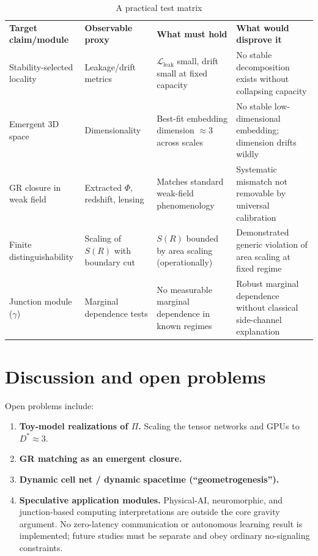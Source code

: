 \documentclass[reprint, amsmath, amssymb, aps, prd]{revtex4-2}
\begin{document}
\begin{table}[htbp]
\caption{A practical test matrix}
\begin{ruledtabular}
\begin{tabular}{llp{4.5cm}p{4.5cm}}
\textbf{Target claim/module} & \textbf{Observable proxy} & \textbf{What must hold} & \textbf{What would disprove it} \\
\colrule
Stability-selected locality & Leakage/drift metrics & $\mathcal{L}_{\text{leak}}$ small, drift small at fixed capacity & No stable decomposition exists without collapsing capacity \\
Emergent 3D space & Dimensionality & Best-fit embedding dimension $\approx 3$ across scales & No stable low-dimensional embedding; dimension drifts wildly \\
GR closure in weak field & Extracted $\Phi$, redshift, lensing & Matches standard weak-field phenomenology & Systematic mismatch not removable by universal calibration \\
Finite distinguishability & Scaling of $S(R)$ with boundary cut & $S(R)$ bounded by area scaling (operationally) & Demonstrated generic violation of area scaling at fixed regime \\
Junction module ($\gamma$) & Marginal dependence tests & No measurable marginal dependence in known regimes & Robust marginal dependence without classical side-channel explanation \\
\end{tabular}
\end{ruledtabular}
\end{table}

\section{Discussion and open problems}
Open problems include:
\begin{enumerate}
    \item \textbf{Toy-model realizations of $\Pi$.} Scaling the tensor networks and GPUs to $D^* \approx 3$.
    \item \textbf{GR matching as an emergent closure.}
    \item \textbf{Dynamic cell net / dynamic spacetime (``geometrogenesis'').}
    \item \textbf{Speculative application modules.} Physical-AI, neuromorphic, and junction-based computing interpretations are outside the core gravity argument. No zero-latency communication or autonomous learning result is implemented; future studies must be separate and obey ordinary no-signaling constraints.
\end{enumerate}
\end{document}
